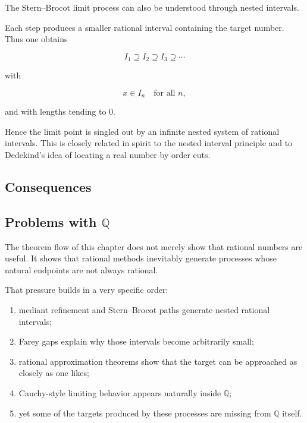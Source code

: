
\begin{remark}
The Stern--Brocot limit process can also be understood through nested
intervals.

Each step produces a smaller rational interval containing the target
number.  Thus one obtains

\[
I_1 \supseteq I_2 \supseteq I_3 \supseteq \cdots
\]

with

\[
x \in I_n
\quad\text{for all }n,
\]

and with lengths tending to $0$.

Hence the limit point is singled out by an infinite nested system of
rational intervals.  This is closely related in spirit to the nested
interval principle and to Dedekind's idea of locating a real number by
order cuts.
\end{remark}


\subsection{Consequences}

\subsection{Problems with $\mathbb{Q}$}

\begin{remark}
The theorem flow of this chapter does not merely show that rational
numbers are useful. It shows that rational methods inevitably generate
processes whose natural endpoints are not always rational.

That pressure builds in a very specific order:
\begin{enumerate}
\item mediant refinement and Stern--Brocot paths generate nested
      rational intervals;
\item Farey gaps explain why those intervals become arbitrarily small;
\item rational approximation theorems show that the target can be
      approached as closely as one likes;
\item Cauchy-style limiting behavior appears naturally inside
      $\mathbb{Q}$;
\item yet some of the targets produced by these processes are missing
      from $\mathbb{Q}$ itself.
\end{enumerate}
\end{remark}

